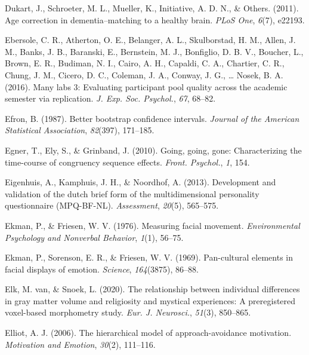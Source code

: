 \documentclass[11pt,american,]{memoir} %
\begin{document}
\leavevmode\hypertarget{ref-Dukart2011-aq}{}%
Dukart, J., Schroeter, M. L., Mueller, K., Initiative, A. D. N., \& Others. (2011). Age correction in dementia--matching to a healthy brain. \emph{PLoS One}, \emph{6}(7), e22193.

\leavevmode\hypertarget{ref-Ebersole2016-cr}{}%
Ebersole, C. R., Atherton, O. E., Belanger, A. L., Skulborstad, H. M., Allen, J. M., Banks, J. B., Baranski, E., Bernstein, M. J., Bonfiglio, D. B. V., Boucher, L., Brown, E. R., Budiman, N. I., Cairo, A. H., Capaldi, C. A., Chartier, C. R., Chung, J. M., Cicero, D. C., Coleman, J. A., Conway, J. G., \ldots{} Nosek, B. A. (2016). Many labs 3: Evaluating participant pool quality across the academic semester via replication. \emph{J. Exp. Soc. Psychol.}, \emph{67}, 68--82.

\leavevmode\hypertarget{ref-efron1987better}{}%
Efron, B. (1987). Better bootstrap confidence intervals. \emph{Journal of the American Statistical Association}, \emph{82}(397), 171--185.

\leavevmode\hypertarget{ref-Egner2010-ot}{}%
Egner, T., Ely, S., \& Grinband, J. (2010). Going, going, gone: Characterizing the time-course of congruency sequence effects. \emph{Front. Psychol.}, \emph{1}, 154.

\leavevmode\hypertarget{ref-Eigenhuis2013-xo}{}%
Eigenhuis, A., Kamphuis, J. H., \& Noordhof, A. (2013). Development and validation of the dutch brief form of the multidimensional personality questionnaire (MPQ-BF-NL). \emph{Assessment}, \emph{20}(5), 565--575.

\leavevmode\hypertarget{ref-Ekman1976-hm}{}%
Ekman, P., \& Friesen, W. V. (1976). Measuring facial movement. \emph{Environmental Psychology and Nonverbal Behavior}, \emph{1}(1), 56--75.

\leavevmode\hypertarget{ref-Ekman1969-pu}{}%
Ekman, P., Sorenson, E. R., \& Friesen, W. V. (1969). Pan-cultural elements in facial displays of emotion. \emph{Science}, \emph{164}(3875), 86--88.

\leavevmode\hypertarget{ref-Van_Elk2020-xo}{}%
Elk, M. van, \& Snoek, L. (2020). The relationship between individual differences in gray matter volume and religiosity and mystical experiences: A preregistered voxel-based morphometry study. \emph{Eur. J. Neurosci.}, \emph{51}(3), 850--865.

\leavevmode\hypertarget{ref-elliot2006hierarchical}{}%
Elliot, A. J. (2006). The hierarchical model of approach-avoidance motivation. \emph{Motivation and Emotion}, \emph{30}(2), 111--116.
\end{document}
